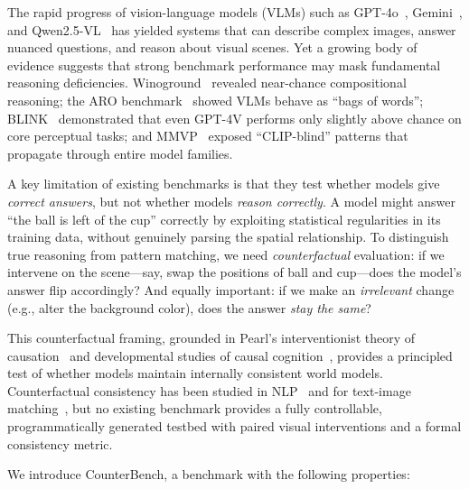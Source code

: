 \documentclass[10pt,twocolumn,letterpaper]{article}
\newcommand{\method}{CounterBench\xspace}
\begin{document}
The rapid progress of vision-language models (VLMs) such as GPT-4o~\cite{achiam2023gpt4}, Gemini~\cite{team2024gemini}, and Qwen2.5-VL~\cite{bai2025qwen25vl} has yielded systems that can describe complex images, answer nuanced questions, and reason about visual scenes. Yet a growing body of evidence suggests that strong benchmark performance may mask fundamental reasoning deficiencies. Winoground~\cite{thrush2022winoground} revealed near-chance compositional reasoning; the ARO benchmark~\cite{yuksekgonul2023aro} showed VLMs behave as ``bags of words''; BLINK~\cite{fu2024blink} demonstrated that even GPT-4V performs only slightly above chance on core perceptual tasks; and MMVP~\cite{tong2024mmvp} exposed ``CLIP-blind'' patterns that propagate through entire model families.

A key limitation of existing benchmarks is that they test whether models give \emph{correct answers}, but not whether models \emph{reason correctly}. A model might answer ``the ball is left of the cup'' correctly by exploiting statistical regularities in its training data, without genuinely parsing the spatial relationship. To distinguish true reasoning from pattern matching, we need \emph{counterfactual} evaluation: if we intervene on the scene---say, swap the positions of ball and cup---does the model's answer flip accordingly? And equally important: if we make an \emph{irrelevant} change (e.g., alter the background color), does the answer \emph{stay the same}?

This counterfactual framing, grounded in Pearl's interventionist theory of causation~\cite{pearl2009causality} and developmental studies of causal cognition~\cite{gopnik2004causal, spelke2007core}, provides a principled test of whether models maintain internally consistent world models. Counterfactual consistency has been studied in NLP~\cite{niu2021cfvqa} and for text-image matching~\cite{wang2023eqben, zhang2024countercurate}, but no existing benchmark provides a fully controllable, programmatically generated testbed with paired visual interventions and a formal consistency metric.

We introduce \method, a benchmark with the following properties:
\end{document}
